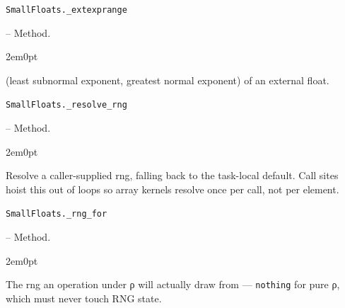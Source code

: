 \par\medskip\noindent\begin{minipage}{\linewidth}
\hypertarget{9616758042032316127}{\texttt{SmallFloats.\_\allowbreak{}extexprange}}  -- {Method.}
\nopagebreak
\begin{adjustwidth}{2em}{0pt}

(least subnormal exponent, greatest normal exponent) of an external float.



\end{adjustwidth}
\end{minipage}
\par\medskip

\par\medskip\noindent\begin{minipage}{\linewidth}
\hypertarget{14260418278412798574}{\texttt{SmallFloats.\_\allowbreak{}resolve\_\allowbreak{}rng}}  -- {Method.}
\nopagebreak
\begin{adjustwidth}{2em}{0pt}

Resolve a caller-supplied rng, falling back to the task-local default. Call sites hoist this out of loops so array kernels resolve once per call, not per element.



\end{adjustwidth}
\end{minipage}
\par\medskip

\par\medskip\noindent\begin{minipage}{\linewidth}
\hypertarget{1104655483086699683}{\texttt{SmallFloats.\_\allowbreak{}rng\_\allowbreak{}for}}  -- {Method.}
\nopagebreak
\begin{adjustwidth}{2em}{0pt}

The rng an operation under ρ will actually draw from — \texttt{nothing} for pure ρ, which must never touch RNG state.



\end{adjustwidth}
\end{minipage}
\par\medskip

